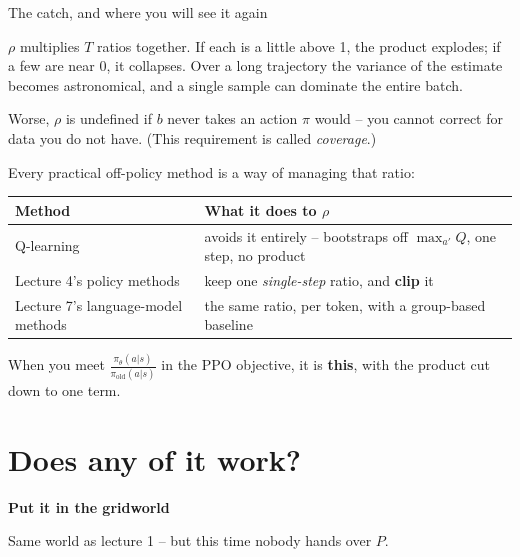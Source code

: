 \documentclass[aspectratio=169]{beamer}
\begin{document}
\begin{frame}{The catch, and where you will see it again}
  \begin{tcolorbox}[colback=armred!8, colframe=armred, boxrule=0.7pt, arc=2pt,
                    title={\textbf{That product is a time bomb}}]
    \small
    $\rho$ multiplies $T$ ratios together. If each is a little above 1, the product explodes;
    if a few are near 0, it collapses. Over a long trajectory the variance of the estimate
    becomes astronomical, and a single sample can dominate the entire batch.

    \vskip 4pt
    Worse, $\rho$ is undefined if $b$ never takes an action $\pi$ would -- you cannot correct
    for data you do not have. (This requirement is called \emph{coverage}.)
  \end{tcolorbox}

  \vskip 8pt
  \small
  Every practical off-policy method is a way of managing that ratio:

  \vskip 4pt
  \begin{center}
  \footnotesize
  \begin{tabular}{l l}
    \toprule
    \textbf{Method} & \textbf{What it does to $\rho$} \\
    \midrule
    Q-learning & avoids it entirely -- bootstraps off $\max_{a'} Q$, one step, no product \\
    Lecture 4's policy methods & keep one \emph{single-step} ratio, and \textbf{clip} it \\
    Lecture 7's language-model methods & the same ratio, per token, with a group-based baseline \\
    \bottomrule
  \end{tabular}
  \end{center}

  \vskip 6pt
  \begin{center}
    \small
    When you meet $\frac{\pi_\theta(a|s)}{\pi_{\text{old}}(a|s)}$ in the PPO objective, it is
    \textbf{this}, with the product cut down to one term.
  \end{center}
\end{frame}

\section{Does any of it work?}
\begin{frame}[plain]
  \begin{center}
    \vskip 1.6cm
    {\Huge\bfseries\color{popblue}Put it in the gridworld}

    \vskip 0.6cm
    {\large Same world as lecture 1 -- but this time nobody hands over $P$.}
  \end{center}
\end{frame}
\end{document}
